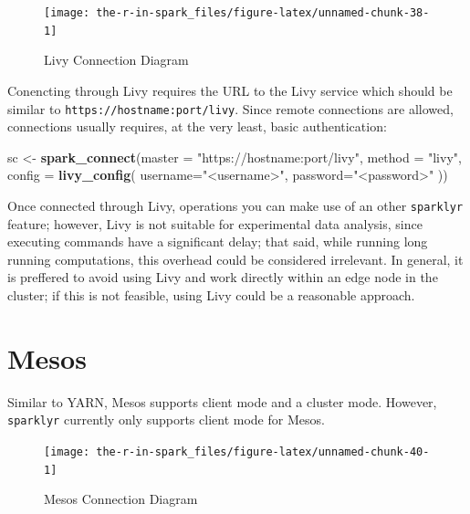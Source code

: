 \documentclass[]{book}
\newenvironment{Shaded}{\begin{snugshade}}{\end{snugshade}}
\newcommand{\DataTypeTok}[1]{\textcolor[rgb]{0.13,0.29,0.53}{#1}}
\newcommand{\KeywordTok}[1]{\textcolor[rgb]{0.13,0.29,0.53}{\textbf{#1}}}
\newcommand{\NormalTok}[1]{#1}
\newcommand{\StringTok}[1]{\textcolor[rgb]{0.31,0.60,0.02}{#1}}
\theoremstyle{definition}
\theoremstyle{definition}
\theoremstyle{definition}
\theoremstyle{remark}
\begin{document}
\begin{figure}

{\centering \texttt{[image: the-r-in-spark\_files/figure-latex/unnamed-chunk-38-1]} 

}

\caption{Livy Connection Diagram}\label{fig:unnamed-chunk-38}
\end{figure}

Conencting through Livy requires the URL to the Livy service which
should be similar to \texttt{https://hostname:port/livy}. Since remote
connections are allowed, connections usually requires, at the very
least, basic authentication:

\begin{Shaded}
\begin{Highlighting}[]
\NormalTok{sc <-}\StringTok{ }\KeywordTok{spark_connect}\NormalTok{(}\DataTypeTok{master =} \StringTok{"https://hostname:port/livy"}\NormalTok{, }\DataTypeTok{method =} \StringTok{"livy"}\NormalTok{, }\DataTypeTok{config =} \KeywordTok{livy_config}\NormalTok{(}
  \DataTypeTok{username=}\StringTok{"<username>"}\NormalTok{,}
  \DataTypeTok{password=}\StringTok{"<password>"}
\NormalTok{))}
\end{Highlighting}
\end{Shaded}

Once connected through Livy, operations you can make use of an other
\texttt{sparklyr} feature; however, Livy is not suitable for
experimental data analysis, since executing commands have a significant
delay; that said, while running long running computations, this overhead
could be considered irrelevant. In general, it is preffered to avoid
using Livy and work directly within an edge node in the cluster; if this
is not feasible, using Livy could be a reasonable approach.

\hypertarget{mesos-1}{%
\section{Mesos}\label{mesos-1}}

Similar to YARN, Mesos supports client mode and a cluster mode. However,
\texttt{sparklyr} currently only supports client mode for Mesos.

\begin{figure}

{\centering \texttt{[image: the-r-in-spark\_files/figure-latex/unnamed-chunk-40-1]} 

}

\caption{Mesos Connection Diagram}\label{fig:unnamed-chunk-40}
\end{figure}
\end{document}
